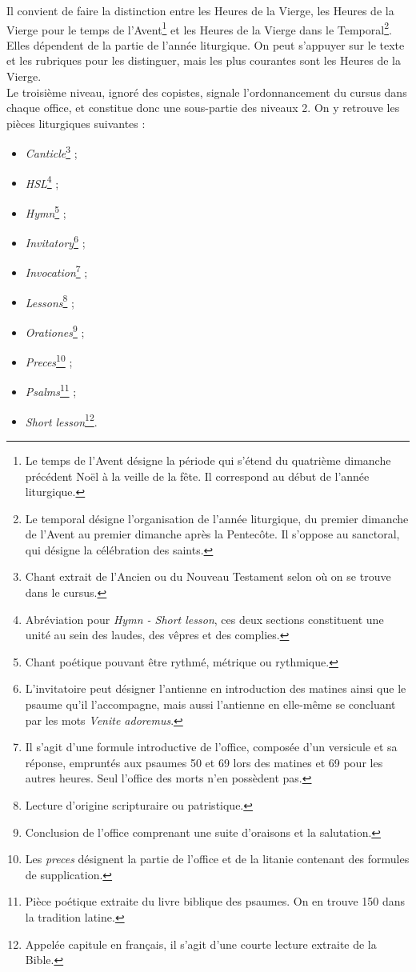 \documentclass[a4paper,12pt,twoside]{book}
\begin{document}
Il convient de faire la distinction entre les Heures de la Vierge, les Heures de la Vierge pour le temps de l'Avent\footnote{Le temps de l'Avent désigne la période qui s'étend du quatrième dimanche précédent Noël à la veille de la fête. Il correspond au début de l'année liturgique.} et les Heures de la Vierge dans le Temporal\footnote{Le temporal désigne l'organisation de l'année liturgique, du premier dimanche de l'Avent au premier dimanche après la Pentecôte. Il s'oppose au sanctoral, qui désigne la célébration des saints.}. Elles dépendent de la partie de l’année liturgique. On peut s’appuyer sur le texte et les rubriques pour les distinguer, mais les plus courantes sont les Heures de la Vierge.\\

Le troisième niveau, ignoré des copistes, signale l'ordonnancement du cursus dans chaque office, et constitue donc une sous-partie des niveaux 2. On y retrouve les pièces liturgiques suivantes : 
\begin{itemize}
    \item \textit{Canticle}\footnote{Chant extrait de l'Ancien ou du Nouveau Testament selon où on se trouve dans le cursus.} ;
    \item \textit{HSL}\footnote{Abréviation pour \og \textit{Hymn - Short lesson}\fg{}, ces deux sections constituent une unité au sein des laudes, des vêpres et des complies.} ;
    \item \textit{Hymn}\footnote{Chant poétique pouvant être rythmé, métrique ou rythmique.} ;
    \item \textit{Invitatory}\footnote{L'invitatoire peut désigner l'antienne en introduction des matines ainsi que le psaume qu'il l'accompagne, mais aussi l'antienne en elle-même se concluant par les mots \og \textit{Venite adoremus}\fg{}.} ;
    \item \textit{Invocation}\footnote{Il s'agit d'une formule introductive de l'office, composée d'un versicule et sa réponse, empruntés aux psaumes 50 et 69 lors des matines et 69 pour les autres heures. Seul l'office des morts n'en possèdent pas.} ;
    \item \textit{Lessons}\footnote{Lecture d'origine scripturaire ou patristique.} ;
    \item \textit{Orationes}\footnote{Conclusion de l'office comprenant une suite d'oraisons et la salutation.} ;
    \item \textit{Preces}\footnote{Les \textit{preces} désignent la partie de l'office et de la litanie contenant des formules de supplication.} ;
    \item \textit{Psalms}\footnote{Pièce poétique extraite du livre biblique des psaumes. On en trouve 150 dans la tradition latine.} ;
    \item \textit{Short lesson}\footnote{Appelée capitule en français, il s'agit d'une courte lecture extraite de la Bible.}.
\end{itemize}
\end{document}

